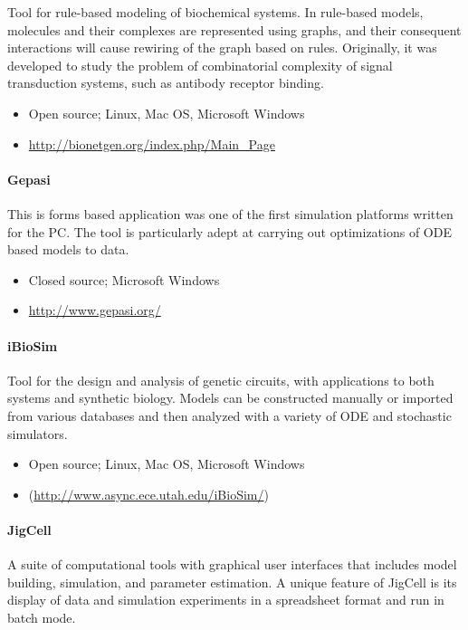 \documentclass[]{article}
\begin{document}
Tool for rule-based modeling of biochemical systems. In rule-based
models, molecules and their complexes are represented using graphs, and
their consequent interactions will cause rewiring of the graph based on
rules. Originally, it was developed to study the problem of
combinatorial complexity of signal transduction systems, such as
antibody receptor binding.

\begin{itemize}
\item
  Open source; Linux, Mac OS, Microsoft Windows
\item
  \url{http://bionetgen.org/index.php/Main_Page}
\end{itemize}
\paragraph{Gepasi \autocite{Gepasi:1993}}

This is forms based application was one of the first simulation
platforms written for the PC. The tool is particularly adept at carrying
out optimizations of ODE based models to data.

\begin{itemize}
\item
  Closed source; Microsoft Windows
\item
  \url{http://www.gepasi.org/}
\end{itemize}
\paragraph{iBioSim \autocite{myers2009ibiosim}}

Tool for the design and analysis of genetic circuits, with applications
to both systems and synthetic biology. Models can be constructed
manually or imported from various databases and then analyzed with a
variety of ODE and stochastic simulators.

\begin{itemize}
\item
  Open source; Linux, Mac OS, Microsoft Windows
\item
  (\url{http://www.async.ece.utah.edu/iBioSim/})
\end{itemize}
\paragraph{JigCell \autocite{vass2004jigcell}
\autocite{vass2006jigcell}}

A suite of computational tools with graphical user interfaces that
includes model building, simulation, and parameter estimation. A unique
feature of JigCell is its display of data and simulation experiments in
a spreadsheet format and run in batch mode.
\end{document}
